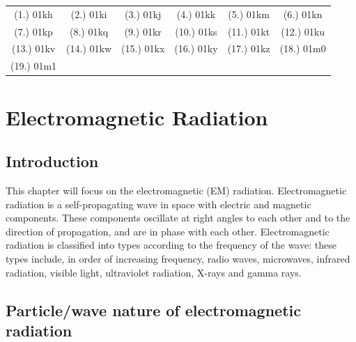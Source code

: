 \begin{eocexercises}{}
\par \practiceinfo
\par \begin{tabular}[h]{cccccc}
(1.)	01kh	&
(2.)	01ki	&
(3.)	01kj	&
(4.)	01kk	&
(5.)	01km	&
(6.)	01kn	\\ %
(7.)	01kp	&
(8.)	01kq	&
(9.)	01kr	&
(10.)	01ks	&
(11.)	01kt	&
(12.)	01ku	\\ %
(13.)	01kv	&
(14.)	01kw	&
(15.)	01kx	&
(16.)	01ky	&
(17.)	01kz	&
(18.)	01m0	\\ %
(19.)	01m1	&
\end{tabular}
\end{eocexercises}






\chapter[EM Radiation]{Electromagnetic Radiation}
\label{p:em:emr12}

\section{Introduction}
This chapter will focus on the electromagnetic (EM) radiation. Electromagnetic radiation is a self-propagating wave in space with electric and magnetic components. These components oscillate at right angles to each other and to the direction of propagation, and are in phase with each other. Electromagnetic radiation is classified into types according to the frequency of the wave: these types include, in order of increasing frequency, radio waves, microwaves, infrared radiation, visible light, ultraviolet radiation, X-rays and gamma rays.


\section{Particle/wave nature of electromagnetic radiation}
\label{p:em:emr12:d}

